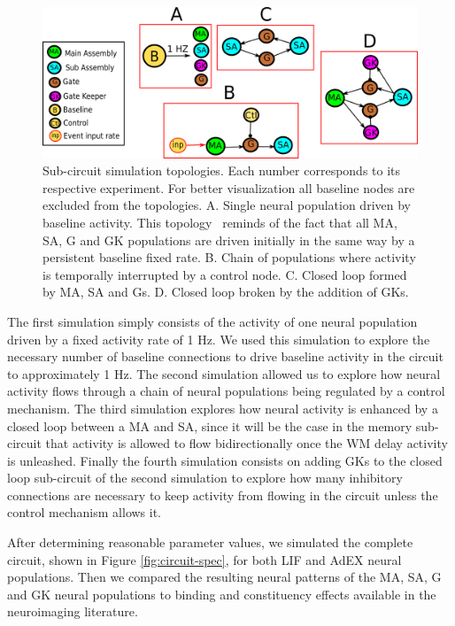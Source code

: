 \documentclass[10pt]{article}
\begin{document}
\begin{figure}[h!]
  \begin{center}
    \includegraphics[width=0.9\columnwidth]{figures/sub_circuits}
    \caption{Sub-circuit simulation topologies.
      Each number corresponds to its respective experiment.
      For better visualization all baseline nodes are excluded from the topologies.
      A. Single neural population driven by baseline activity.
      This topology~ reminds of the fact that all MA, SA, G and GK populations are driven initially in the same way by a persistent baseline fixed rate.
      B. Chain of populations where activity is temporally interrupted by a control node.
      C. Closed loop formed by MA, SA and Gs.
      D. Closed loop broken by the addition of GKs. {\label{sub_circuits}}%
    }
  \end{center}
\end{figure}

The first simulation simply consists of the activity of one neural population driven by a fixed activity rate of 1 Hz.
We used this simulation to explore the necessary number of baseline connections to drive baseline activity in the circuit to approximately 1 Hz.
The second simulation allowed us to explore how neural activity flows through a chain of neural populations being regulated by a control mechanism.
The third simulation explores how neural activity is enhanced by a closed loop between a MA and SA, since it will be the case in the memory sub-circuit that activity is allowed to flow bidirectionally once the WM delay activity is unleashed.
Finally the fourth simulation consists on adding GKs to the closed loop sub-circuit of the second simulation to explore how many inhibitory connections are necessary to keep activity from flowing in the circuit unless the control mechanism allows it.

After determining reasonable parameter values, we simulated the complete circuit, shown in Figure \ref{fig:circuit-spec}, for both LIF and AdEX neural populations.
Then we compared the resulting neural patterns of the MA, SA, G and GK neural populations to binding and constituency effects available in the neuroimaging literature.
\end{document}
